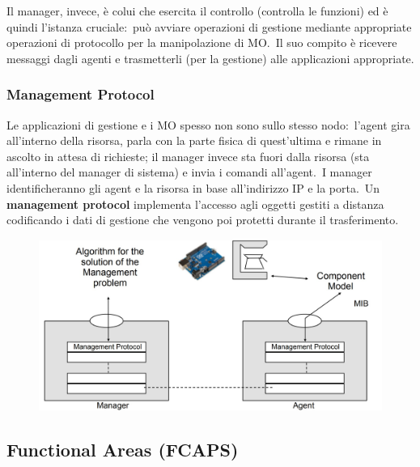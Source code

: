 Il manager, invece, è colui che esercita il controllo (controlla le funzioni) ed è quindi l'istanza cruciale:\ può avviare operazioni di gestione mediante appropriate operazioni di protocollo per la manipolazione di MO.\
Il suo compito è ricevere messaggi dagli agenti e trasmetterli (per la gestione) alle applicazioni appropriate.

\subsubsection{Management Protocol}

Le applicazioni di gestione e i MO spesso non sono sullo stesso nodo:\ l'agent gira all'interno della risorsa, parla con la parte fisica di quest'ultima e rimane in ascolto in attesa di richieste; il manager invece sta fuori dalla risorsa (sta all'interno del manager di sistema) e invia i comandi all'agent.\
I manager identificheranno gli agent e la risorsa in base all'indirizzo IP e la porta.\
Un \textbf{management protocol} implementa l'accesso agli oggetti gestiti a distanza codificando i dati di gestione che vengono poi protetti durante il trasferimento.

\begin{figure}[H]
    \centering
    \includegraphics[width=\textwidth]{immagini/ManagementProtocol.jpg}
\end{figure}

\subsection{Functional Areas (FCAPS)}

